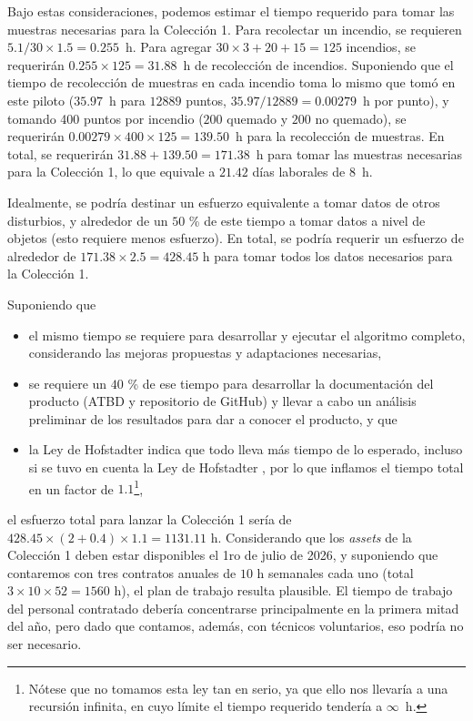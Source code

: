 \documentclass[11pt,a4paper]{article}
\begin{document}
Bajo estas consideraciones, podemos estimar el tiempo requerido para tomar las muestras necesarias para la Colección 1. Para recolectar un incendio, se requieren $5.1 / 30 \times 1.5 = 0.255$~h. Para agregar $30 \times 3 + 20 + 15 = 125$ incendios, se requerirán $0.255 \times 125 = 31.88$~h de recolección de incendios. Suponiendo que el tiempo de recolección de muestras en cada incendio toma lo mismo que tomó en este piloto ($35.97$~h para $12889$ puntos, $35.97 / 12889 = 0.00279$~h por punto), y tomando 400 puntos por incendio ($200$ quemado y $200$ no quemado), se requerirán $0.00279 \times 400 \times 125 = 139.50$~h para la recolección de muestras. En total, se requerirán $31.88 + 139.50 = 171.38$~h para tomar las muestras necesarias para la Colección 1, lo que equivale a $21.42$ días laborales de $8$~h.

Idealmente, se podría destinar un esfuerzo equivalente a tomar datos de otros disturbios, y alrededor de un $50$ \% de este tiempo a tomar datos a nivel de objetos (esto requiere menos esfuerzo). En total, se podría requerir un esfuerzo de alrededor de $171.38 \times 2.5 = 428.45$ h para tomar todos los datos necesarios para la Colección 1.

Suponiendo que 

\begin{itemize}
  \item el mismo tiempo se requiere para desarrollar y ejecutar el algoritmo completo, considerando las mejoras propuestas y adaptaciones necesarias,
  \item se requiere un $40$ \% de ese tiempo para desarrollar la documentación del producto (ATBD y repositorio de GitHub) y llevar a cabo un análisis preliminar de los resultados para dar a conocer el producto, y que 
  \item la Ley de Hofstadter indica que todo lleva más tiempo de lo esperado, incluso si se tuvo en cuenta la Ley de Hofstadter \parencite{hofstadter1979}, por lo que inflamos el tiempo total en un factor de $1.1$\footnote{Nótese que no tomamos esta ley tan en serio, ya que ello nos llevaría a una recursión infinita, en cuyo límite el tiempo requerido tendería a $\infty$~h.},
\end{itemize}

\noindent el esfuerzo total para lanzar la Colección 1 sería de $428.45 \times (2 + 0.4) \times 1.1 = 1131.11$ h. Considerando que los \textit{assets} de la Colección 1 deben estar disponibles el 1ro de julio de 2026, y suponiendo que contaremos con tres contratos anuales de $10$ h semanales cada uno (total $3 \times 10 \times 52 = 1560$ h), el plan de trabajo resulta plausible. El tiempo de trabajo del personal contratado debería concentrarse principalmente en la primera mitad del año, pero dado que contamos, además, con técnicos voluntarios, eso podría no ser necesario. 
\end{document}
